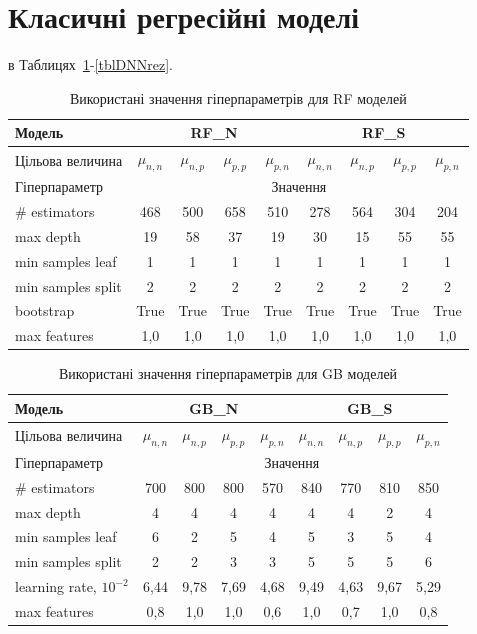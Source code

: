 \documentclass[10pt,a5paper,titlepage,oneside]{book}
\numberwithin{equation}{part}
\begin{document}
\section{Класичні регресійні моделі}

в Таблицях~\ref{tblRFrez}-\ref{tblDNNrez}.

\begin{table}
\setlength{\tabcolsep}{3pt}
\caption{Використані значення гіперпараметрів для RF моделей}
\label{tblRFrez}
\centering
\begin{tabular}{|l|c|c|c|c|c|c|c|c|}
\hline
Модель& \multicolumn{4}{c|}{RF\_N}& \multicolumn{4}{c|}{RF\_S} \rule{0pt}{11pt}\\
\hline
Цільова величина&$\mu_{n,n}$&$\mu_{n,p}$&$\mu_{p,p}$&$\mu_{p,n}$&$\mu_{n,n}$&$\mu_{n,p}$&$\mu_{p,p}$&$\mu_{p,n}$\\
\hline
Гіперпараметр&\multicolumn{8}{c|}{Значення}\\
\hline
\# estimators&468&500&658&510&278&564&304&204\\
\hline
max depth&19&58&37&19&30&15&55&55\\
\hline
min samples leaf &1&1&1&1&1&1&1&1\\
\hline
min samples split	&2&2&2&2&2&2&2&2\\
\hline
bootstrap	&True&True&True&True&True&True&True&True\\
\hline
max features &1,0&1,0&1,0&1,0&1,0&1,0&1,0&1,0\\
\hline
\end{tabular}
\end{table}


\begin{table}[!ht]
\setlength{\tabcolsep}{3pt}
\caption{Використані значення гіперпараметрів для GB моделей}
\label{tblGBrez}
\begin{tabular}{|l|c|c|c|c|c|c|c|c|}
\hline
Модель& \multicolumn{4}{c|}{GB\_N}& \multicolumn{4}{c|}{GB\_S} \rule{0pt}{11pt}\\
\hline
Цільова величина&$\mu_{n,n}$&$\mu_{n,p}$&$\mu_{p,p}$&$\mu_{p,n}$&$\mu_{n,n}$&$\mu_{n,p}$&$\mu_{p,p}$&$\mu_{p,n}$\\
\hline
Гіперпараметр&\multicolumn{8}{c|}{Значення}\\
\hline
\# estimators&700&800&800&570&840&770&810&850\\
\hline
max depth&4&4&4&4&4&4&2&4\\
\hline
min samples leaf &6&2&5&4&5&3&5&4\\
\hline
min samples split	&2&2&3&3&5&5&5&6\\
\hline
learning rate, $10^{-2}$	&6,44&9,78&7,69&4,68&9,49&4,63&9,67&5,29\\
\hline
max features &0,8&1,0&1,0&0,6&1,0&0,7&1,0&0,8\\
\hline
\end{tabular}
\end{table}
\end{document}
